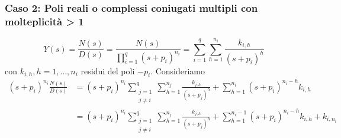 \documentclass{article}
\numberwithin{equation}{subsection}
\begin{document}
\subsubsection{Caso 2: Poli reali o complessi coniugati multipli con molteplicità > 1}
\begin{equation}
    Y(s) = \frac{N(s)}{D(s)} = \frac{N(s)}{\prod\limits_{i=1}^q (s + p_i)^{n_i}} = \sum_{i=1}^q \sum_{h=1}^{n_i} \frac{k_{i,h}}{(s+p_i)^h}
\end{equation}
con $k_{i,h}, h=1,\dots, n_i$ residui del poli $-p_i$. Consideriamo
\begin{align*}
    (s+p_i)^{n_i} \frac{N(s)}{D(s)}
    &=(s+p_i)^{n_i} \sum_{\substack{j=1\\ j \neq i}}^q \sum_{h=1}^{n_j} \frac{k_{j,h}}{(s+p_j)^h} + \sum_{h=1}^{n_i} (s+p_i)^{n_i - h}k_{i,h}
    \\
    &=(s+p_i)^{n_i} \sum_{\substack{j=1\\ j \neq i}}^q \sum_{h=1}^{n_j} \frac{k_{j,h}}{(s+p_j)^h} + \sum_{h=1}^{n_i-1} (s+p_i)^{n_i - h}k_{i,h} + k_{i,n_i}
\end{align*}
\end{document}
